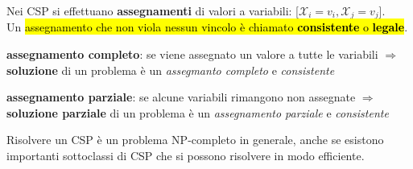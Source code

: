 \documentclass[12pt, a4paper, oneside]{book}
\begin{document}
    Nei CSP si effettuano \textbf{assegnamenti} di valori a variabili: [$\mathcal{X}_i = v_i, \mathcal{X}_j = v_j$]. \\[0.2ex]
    Un \hl{assegnamento che non viola nessun vincolo è chiamato \textbf{consistente} o \textbf{legale}}.
    \begin{description}[labelindent=0.5cm]
      \item \textbf{assegnamento completo}: se viene assegnato un valore a tutte le variabili $\Rightarrow$ \textbf{soluzione} di un problema è un \textit{assegmanto completo} e \textit{consistente} \\[0.1ex]
      \item \textbf{assegnamento parziale}: se alcune variabili rimangono non assegnate $\Rightarrow$ \textbf{soluzione parziale} di un problema è un \textit{assegnamento parziale} e \textit{consistente}  
    \end{description}

    Risolvere un CSP è un problema NP-completo in generale, anche se esistono importanti sottoclassi di CSP che si possono risolvere in modo efficiente.
\end{document}
